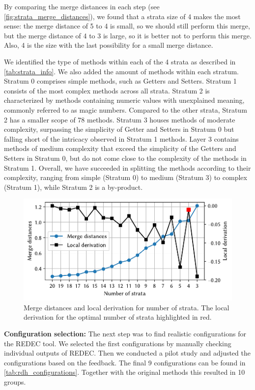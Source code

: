 \documentclass[%
class=scrreprt,
chapterprefix=false,%
open=right,%
twoside=false,%
paper=a4,%
logofile={Logo\_zentral\_farbig\_EN.png},%
thesistype=master,%
UKenglish,%
]{se2thesis}
\theoremstyle{definition}
\newcommand{\rdh}{REDEC\xspace}
\begin{document}
	By comparing the merge distances in each step (see \autoref{fig:strata_merge_distances}), we found that a strata size of 4 makes the most sense: the merge distance of 5 to 4 is small, so we should still perform this merge, but the merge distance of 4 to 3 is large, so it is better not to perform this merge. Also, 4 is the size with the last possibility for a small merge distance.
	
	We identified the type of methods within each of the 4 strata as described in \autoref{tab:strata_info}. We also added the amount of methods within each stratum. Stratum 0 comprises simple methods, such as Getters and Setters. Stratum 1 consists of the most complex methods across all strata. Stratum 2 is characterized by methods containing numeric values with unexplained meaning, commonly referred to as magic numbers. Compared to the other strata, Stratum 2 has a smaller scope of 78 methods. Stratum 3 houses methods of moderate complexity, surpassing the simplicity of Getter and Setters in Stratum 0 but falling short of the intricacy observed in Stratum 1 methods. Layer 3 contains methods of medium complexity that exceed the simplicity of the Getters and Setters in Stratum 0, but do not come close to the complexity of the methods in Stratum 1. Overall, we have succeeded in splitting the methods according to their complexity, ranging from simple (Stratum 0) to medium (Stratum 3) to complex (Stratum 1), while Stratum 2 is a by-product.
	
	\begin{figure}[tb]
		\centering
		\includegraphics[width=\textwidth]{img/strata_merge_distances.pdf}
		\caption{Merge distances and local derivation for number of strata. The local derivation for the optimal number of strata highlighted in red.} 
		\label{fig:strata_merge_distances}
	\end{figure}
	
	\textbf{Configuration selection:} The next step was to find realistic configurations for the \rdh tool. We selected the first configurations by manually checking individual outputs of \rdh. Then we conducted a pilot study and adjusted the configurations based on the feedback.
	The final 9 configurations can be found in \autoref{tab:rdh_configurations}. Together with the original methods this resulted in 10 groups.
	
\end{document}
